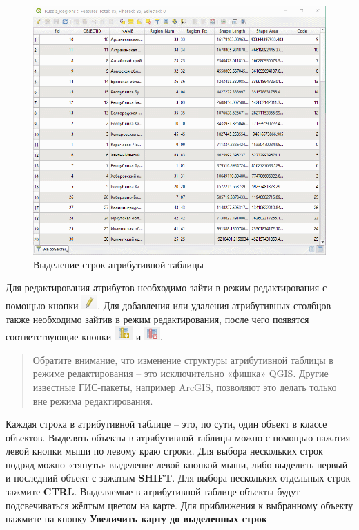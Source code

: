 \documentclass[
  12pt,
]{book}
\begin{document}
\begin{figure}
\centering
\includegraphics{images/vector/Attribute_table.gif}
\caption{Выделение строк атрибутивной таблицы}
\end{figure}

Для редактирования атрибутов необходимо зайти в режим редактирования с помощью кнопки \includegraphics{images/vector/Edit.png}. Для добавления или удаления атрибутивных столбцов также необходимо зайтив в режим редактирования, после чего появятся соответствующие кнопки \includegraphics{images/vector/New_field.png} и \includegraphics{images/vector/Delete_field.png}.

\begin{quote}
Обратите внимание, что изменение структуры атрибутивной таблицы в режиме редактирования -- это исключительно «фишка» QGIS. Другие известные ГИС-пакеты, например ArcGIS, позволяют это делать только вне режима редактирования.
\end{quote}

Каждая строка в атрибутивной таблице -- это, по сути, один объект в классе объектов. Выделять объекты в атрибутивной таблицы можно с помощью нажатия левой кнопки мыши по левому краю строки. Для выбора нескольких строк подряд можно «тянуть» выделение левой кнопкой мыши, либо выделить первый и последний объект с зажатым \textbf{SHIFT}. Для выбора нескольких отдельных строк зажмите \textbf{CTRL}. Выделяемые в атрибутивной таблице объекты будут подсвечиваться жёлтым цветом на карте. Для приближения к выбранному объекту нажмите на кнопку \textbf{Увеличить карту до выделенных строк}
\end{document}
